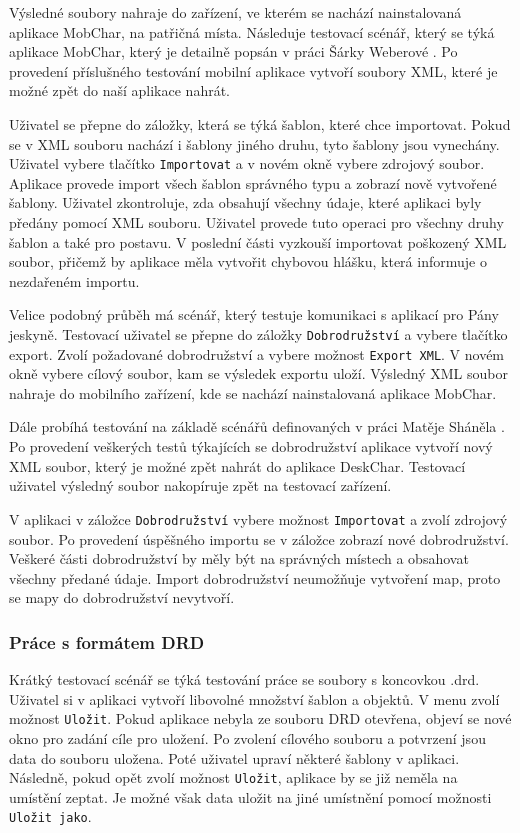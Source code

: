 \documentclass[thesis=B,czech]{resources/FITthesis}[2012/06/26]
\begin{document}
Výsledné soubory nahraje do zařízení, ve kterém se nachází nainstalovaná aplikace MobChar, na patřičná místa. Následuje testovací scénář, který se týká aplikace MobChar, který je detailně popsán v práci Šárky Weberové \cite{Weberova_2017}. Po provedení příslušného testování mobilní aplikace vytvoří soubory XML, které je možné zpět do naší aplikace nahrát. \par

Uživatel se přepne do záložky, která se týká šablon, které chce importovat. Pokud se v XML souboru nachází i šablony jiného druhu, tyto šablony jsou vynechány. Uživatel vybere tlačítko \texttt{Importovat} a v novém okně vybere zdrojový soubor. Aplikace provede import všech šablon správného typu a zobrazí nově vytvořené šablony. Uživatel zkontroluje, zda obsahují všechny údaje, které aplikaci byly předány pomocí XML souboru. Uživatel provede tuto operaci pro všechny druhy šablon a také pro postavu. V poslední části vyzkouší importovat poškozený XML soubor, přičemž by aplikace měla vytvořit chybovou hlášku, která informuje o nezdařeném importu. \par

Velice podobný průběh má scénář, který testuje komunikaci s aplikací pro Pány jeskyně. Testovací uživatel se přepne do záložky \texttt{Dobrodružství} a vybere tlačítko export. Zvolí požadované dobrodružství a vybere možnost \texttt{Export XML}. V novém okně vybere cílový soubor, kam se výsledek exportu uloží. Výsledný XML soubor nahraje do mobilního zařízení, kde se nachází nainstalovaná aplikace MobChar. \par

Dále probíhá testování na základě scénářů definovaných v práci Matěje Sháněla \cite{Shanel_2017}. Po provedení veškerých testů týkajících se dobrodružství aplikace vytvoří nový XML soubor, který je možné zpět nahrát do aplikace DeskChar. Testovací uživatel výsledný soubor nakopíruje zpět na testovací zařízení. \par

V aplikaci v záložce \texttt{Dobrodružství} vybere možnost \texttt{Importovat} a zvolí zdrojový soubor. Po provedení úspěšného importu se v záložce zobrazí nové dobrodružství. Veškeré části dobrodružství by měly být na správných místech a obsahovat všechny předané údaje. Import dobrodružství neumožňuje vytvoření map, proto se mapy do dobrodružství nevytvoří. 

\subsubsection{Práce s formátem DRD}
Krátký testovací scénář se týká testování práce se soubory s koncovkou .drd. Uživatel si v aplikaci vytvoří libovolné množství šablon a objektů. V menu zvolí možnost \texttt{Uložit}. Pokud aplikace nebyla ze souboru DRD otevřena, objeví se nové okno pro zadání cíle pro uložení. Po zvolení cílového souboru a potvrzení jsou data do souboru uložena. Poté uživatel upraví některé šablony v aplikaci. Následně, pokud opět zvolí možnost \texttt{Uložit}, aplikace by se již neměla na umístění zeptat. Je možné však data uložit na jiné umístnění pomocí možnosti \texttt{Uložit jako}. \par
\end{document}
